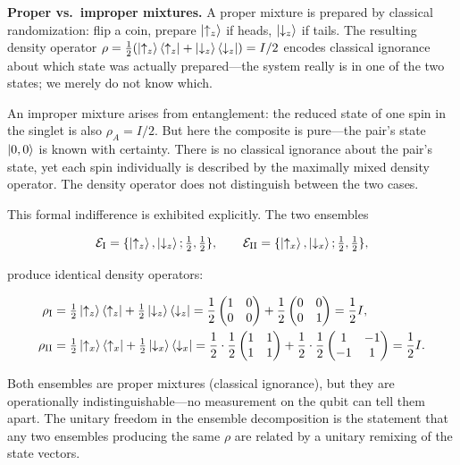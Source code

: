 \medskip\noindent\textbf{Proper vs.\ improper mixtures.}
A proper mixture is prepared by classical randomization: flip a coin, prepare $\ket{\uparrow_z}$ if heads, $\ket{\downarrow_z}$ if tails. The resulting density operator $\rho = \frac12(\ket{\uparrow_z}\bra{\uparrow_z} + \ket{\downarrow_z}\bra{\downarrow_z}) = I/2$ encodes classical ignorance about which state was actually prepared---the system really is in one of the two states; we merely do not know which.

An improper mixture arises from entanglement: the reduced state of one spin in the singlet is also $\rho_A = I/2$. But here the composite is pure---the pair's state $\ket{0,0}$ is known with certainty. There is no classical ignorance about the pair's state, yet each spin individually is described by the maximally mixed density operator. The density operator does not distinguish between the two cases.

This formal indifference is exhibited explicitly. The two ensembles
\begin{linenomath}
\begin{equation}
\mathcal{E}_{\text{I}} = \{\ket{\uparrow_z}, \ket{\downarrow_z}; \tfrac12,\tfrac12\},\qquad
\mathcal{E}_{\text{II}} = \{\ket{\uparrow_x}, \ket{\downarrow_x}; \tfrac12,\tfrac12\},
\end{equation}
\end{linenomath}
produce identical density operators:
\begin{linenomath}
\begin{align}
\rho_{\text{I}}
&= \tfrac12\ket{\uparrow_z}\bra{\uparrow_z} + \tfrac12\ket{\downarrow_z}\bra{\downarrow_z}
= \frac12\begin{pmatrix}1&0\\0&0\end{pmatrix} + \frac12\begin{pmatrix}0&0\\0&1\end{pmatrix}
= \frac12 I, \\
\rho_{\text{II}}
&= \tfrac12\ket{\uparrow_x}\bra{\uparrow_x} + \tfrac12\ket{\downarrow_x}\bra{\downarrow_x}
= \frac12\cdot\frac12\begin{pmatrix}1&1\\1&1\end{pmatrix} + \frac12\cdot\frac12\begin{pmatrix}1&-1\\-1&1\end{pmatrix}
= \frac12 I.
\end{align}
\end{linenomath}
Both ensembles are proper mixtures (classical ignorance), but they are operationally indistinguishable---no measurement on the qubit can tell them apart. The unitary freedom in the ensemble decomposition is the statement that any two ensembles producing the same $\rho$ are related by a unitary remixing of the state vectors.

